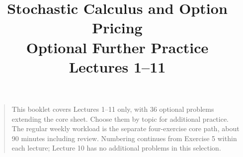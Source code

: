 \documentclass[11pt]{article}
\title{Stochastic Calculus and Option Pricing\\Optional Further Practice\\\large Lectures 1--11}
\author{}
\date{}
\newcommand{\1}{\mathbf{1}}
\theoremstyle{definition}
\begin{document}
\maketitle
\vspace{-1.2em}
\begin{quote}\small
This booklet covers Lectures 1--11 only, with 36 optional problems
extending the core sheet.
Choose them by topic for additional practice. The regular weekly workload
is the separate four-exercise core path, about 90 minutes including review.
Numbering continues from Exercise 5 within each lecture; Lecture 10 has
no additional problems in this selection.
\end{quote}
\def\ExercisesSynthesis{true}
\setcounter{section}{0}

\clearpage
\setcounter{section}{1}

\clearpage
\setcounter{section}{2}

\clearpage
\setcounter{section}{3}

\clearpage
\setcounter{section}{4}

\clearpage
\setcounter{section}{5}

\clearpage
\setcounter{section}{6}

\clearpage
\setcounter{section}{7}

\clearpage
\setcounter{section}{8}

\clearpage
\setcounter{section}{10}

\end{document}
